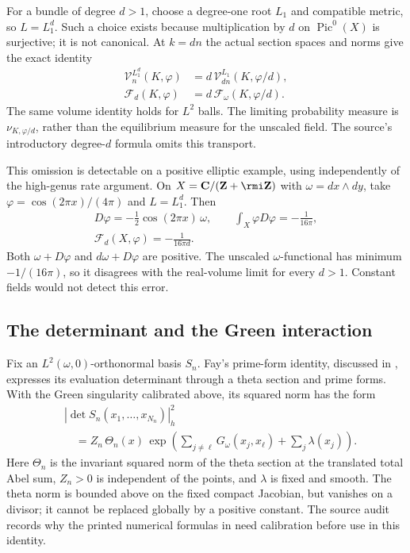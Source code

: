 For a bundle of degree $d>1$, choose a degree-one root $L_1$
and compatible metric, so $L=L_1^d$. Such a choice exists
because multiplication by $d$ on $\operatorname{Pic}^0(X)$
is surjective; it is not canonical. At $k=dn$ the actual
section spaces and norms give the exact identity
\[
 \begin{aligned}
 \mathcal V_n^{L_1^d}(K,\varphi)
   &=d\,\mathcal V_{dn}^{L_1}(K,\varphi/d),\\
 \mathcal F_d(K,\varphi)
   &=d\,\mathcal F_\omega(K,\varphi/d).
 \end{aligned}
 \tag{H.150}\label{eq:appH-curve-degree-transport}
\]
The same volume identity holds for $L^2$ balls. The limiting
probability measure is $\nu_{K,\varphi/d}$, rather than the
equilibrium measure for the unscaled field. The source's
introductory degree-$d$ formula omits this transport.

This omission is detectable on a positive elliptic example,
using \cite[Theorem~A]{BB10} independently of the high-genus
rate argument. On $X=\mathbf C/(\mathbf Z+\rmi\mathbf Z)$
with $\omega=dx\wedge dy$, take
$\varphi=\cos(2\pi x)/(4\pi)$ and $L=L_1^d$. Then
\[
 \begin{gathered}
 D\varphi=-\tfrac12\cos(2\pi x)\,\omega,
 \qquad \int_X\varphi D\varphi=-\frac1{16\pi},\\
 \mathcal F_d(X,\varphi)=-\frac1{16\pi d}.
 \end{gathered}
 \tag{H.151}\label{eq:appH-curve-degree-test}
\]
Both $\omega+D\varphi$ and $d\omega+D\varphi$ are positive.
The unscaled $\omega$-functional has minimum $-1/(16\pi)$,
so it disagrees with the real-volume limit for every $d>1$.
Constant fields would not detect this error.

\subsection{The determinant and the Green interaction}

Fix an $L^2(\omega,0)$-orthonormal basis $S_n$. Fay's
prime-form identity, discussed in
\cite[Proposition~3.2]{Klevtsov19LaughlinV3}, expresses its
evaluation determinant through a theta section and prime forms.
With the Green singularity calibrated above, its squared norm
has the form
\[
 \begin{aligned}
 &|\det S_n(x_1,\ldots,x_{N_n})|_h^2\\
 &\quad=Z_n\,\Theta_n(x)\,
   \exp\!\left(\sum_{j\ne\ell}G_\omega(x_j,x_\ell)
                       +\sum_j\lambda(x_j)\right).
 \end{aligned}
 \tag{H.152}\label{eq:appH-curve-bosonization}
\]
Here $\Theta_n$ is the invariant squared norm of the theta
section at the translated total Abel sum, $Z_n>0$ is independent
of the points, and $\lambda$ is fixed and smooth. The theta
norm is bounded above on the fixed compact Jacobian, but
vanishes on a divisor; it cannot be replaced globally by a
positive constant. The source audit records why the printed
numerical formulas in \cite{Klevtsov19LaughlinV3,Zelditch11ZerosV1}
need calibration before use in this identity.

